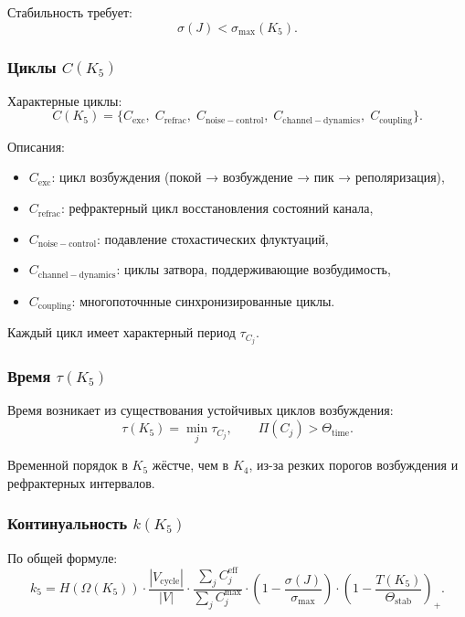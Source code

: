 Стабильность требует:
\[
\sigma(J) < \sigma_{\max}(K_5).
\]

\subsubsection{Циклы \texorpdfstring{$C(K_5)$}{C(K_5)}}

Характерные циклы:
\[
C(K_5)
= \{ C_{\mathrm{exc}},\;
     C_{\mathrm{refrac}},\;
     C_{\mathrm{noise-control}},\;
     C_{\mathrm{channel-dynamics}},\;
     C_{\mathrm{coupling}} \}.
\]

Описания:
\begin{itemize}
    \item $C_{\mathrm{exc}}$: цикл возбуждения (покой → возбуждение →
          пик → реполяризация),
    \item $C_{\mathrm{refrac}}$: рефрактерный цикл восстановления состояний
          канала,
    \item $C_{\mathrm{noise-control}}$: подавление стохастических
          флуктуаций,
    \item $C_{\mathrm{channel-dynamics}}$: циклы затвора, поддерживающие
          возбудимость,
    \item $C_{\mathrm{coupling}}$: многопоточнные синхронизированные
          циклы.
\end{itemize}

Каждый цикл имеет характерный период $\tau_{C_j}$.

\subsubsection{Время \texorpdfstring{$\tau(K_5)$}{\tau(K_5)}}

Время возникает из существования устойчивых циклов возбуждения:
\[
\tau(K_5)
    = \min_j \tau_{C_j},
\qquad
\Pi(C_j) > \Theta_{\mathrm{time}}.
\]

Временной порядок в $K_5$ жёстче, чем в $K_4$, из-за резких порогов
возбуждения и рефрактерных интервалов.

\subsubsection{Континуальность \texorpdfstring{$k(K_5)$}{k(K_5)}}

По общей формуле:
\[
k_5
= H(\Omega(K_5))
  \cdot\frac{|V_{\mathrm{cycle}}|}{|V|}
  \cdot\frac{\sum_j C_j^{\mathrm{eff}}}{\sum_j C_j^{\max}}
  \cdot\left(1-\frac{\sigma(J)}{\sigma_{\max}}\right)
  \cdot\left(1-\frac{T(K_5)}{\Theta_{\mathrm{stab}}}\right)_+.
\]

